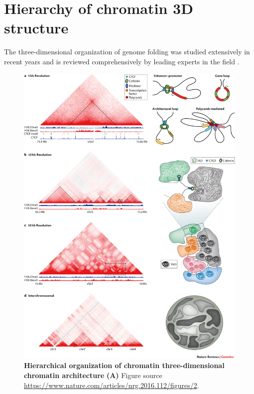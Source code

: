 \documentclass[a4paper,twoside=true,openright,parskip=full,chapterprefix=true,11pt,headings=normal,bibliography=totoc,listof=totoc,titlepage=on,captions=tableabove,draft=false]{scrreprt}
\theoremstyle{definition}
\theoremstyle{definition}
\theoremstyle{definition}
\theoremstyle{remark}
\begin{document}
\hypertarget{hierarchy-of-chromatin-3d-structure}{%
\section{Hierarchy of chromatin 3D
structure}\label{hierarchy-of-chromatin-3d-structure}}

The three-dimensional organization of genome folding was studied
extensively in recent years and is reviewed comprehensively by leading
experts in the field
\citep{Pombo2015, Sexton2015, Bouwman2015, Dekker2016, Dixon2016, Schmitt2016, Bonev2016, Hnisz2016a, Merkenschlager2016, Long2016, Ruiz-Velasco2017, Andrey2017}.

\begin{figure}

{\centering \includegraphics[width=1\linewidth]{figures/Bonev2016Fig2} 

}

\caption{\textbf{Hierarchical organization of chromatin
three-dimensional chromatin architecture} \textbf{(A)} Figure source
\citep{Bonev2016}
\url{https://www.nature.com/articles/nrg.2016.112/figures/2}.}\label{fig:GenomeHierarchy}
\end{figure}
\end{document}
